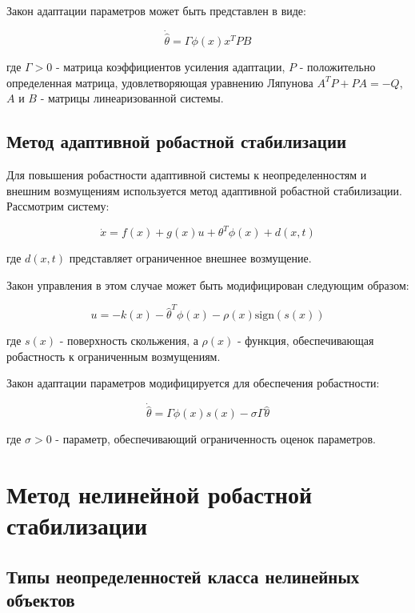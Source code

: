 \documentclass[a4paper,14pt]{extarticle} %
\begin{document}
Закон адаптации параметров может быть представлен в виде:

\begin{equation}
\dot{\hat{\theta}} = \Gamma\phi(x)x^TPB
\end{equation}

где $\Gamma > 0$ - матрица коэффициентов усиления адаптации, $P$ - положительно определенная матрица, удовлетворяющая уравнению Ляпунова $A^TP + PA = -Q$, $A$ и $B$ - матрицы линеаризованной системы.

\subsection{Метод адаптивной робастной стабилизации}

Для повышения робастности адаптивной системы к неопределенностям и внешним возмущениям используется метод адаптивной робастной стабилизации. Рассмотрим систему:

\begin{equation}
\dot{x} = f(x) + g(x)u + \theta^T\phi(x) + d(x,t)
\end{equation}

где $d(x,t)$ представляет ограниченное внешнее возмущение.

Закон управления в этом случае может быть модифицирован следующим образом:

\begin{equation}
u = -k(x) - \hat{\theta}^T\phi(x) - \rho(x)\text{sign}(s(x))
\end{equation}

где $s(x)$ - поверхность скольжения, а $\rho(x)$ - функция, обеспечивающая робастность к ограниченным возмущениям.

Закон адаптации параметров модифицируется для обеспечения робастности:

\begin{equation}
\dot{\hat{\theta}} = \Gamma\phi(x)s(x) - \sigma\Gamma\hat{\theta}
\end{equation}

где $\sigma > 0$ - параметр, обеспечивающий ограниченность оценок параметров.

\section{Метод нелинейной робастной стабилизации}

\subsection{Типы неопределенностей класса нелинейных объектов}
\end{document}
